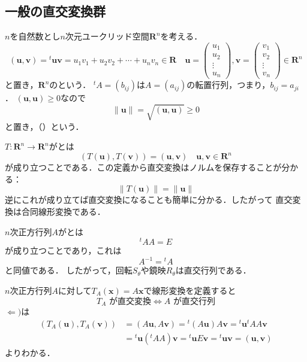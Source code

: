 %
%
%
%

\subsection{一般の直交変換群}
$n$を自然数とし$n$次元ユークリッド空間$\mathbf R^n$を考える．
\[
     (\mathbf u,\mathbf v)={}^t\mathbf u\mathbf v
     =u_1v_1+u_2v_2+\cdots+u_nv_n\in \mathbf R
     \quad
     \mathbf u
      =\begin{pmatrix}
              u_1\\u_2\\\vdots\\u_n
     \end{pmatrix},
     \mathbf v
      =\begin{pmatrix}
              v_1\\v_2\\\vdots\\v_n
     \end{pmatrix}
     \in \mathbf R^n
\]
と置き，$\mathbf R^n$のという．
${}^tA=(b_{ij})$は$A=(a_{ij})$の転置行列，つまり，$b_{ij}=a_{ji}$．
$(\mathbf u,\mathbf u)\ge 0$なので
\[
     \|\mathbf u\| 
     = 
     \sqrt{(\mathbf u,\mathbf u)}
     \ge 0
\]
と置き，（）という．

$T:\mathbf R^n\to \mathbf R^n$がとは
\begin{equation}\label{orthogonalTransform}
     (T(\mathbf u),T(\mathbf v))
     =
     (\mathbf u,\mathbf v)\quad
     \mathbf u,\mathbf v\in \mathbf R^n
\end{equation}
が成り立つことである．この定義から直交変換はノルムを保存することが分かる：
\begin{equation}\label{preserveNorm}
     \|T(\mathbf u)\| = \|\mathbf u\| 
\end{equation}
逆にこれが成り立てば直交変換になることも簡単に分かる．したがって
直交変換は合同線形変換である．

$n$次正方行列$A$がとは
\[
     {}^tAA=E
\]
が成り立つことであり，これは
\[
     A^{-1}={}^tA
\]と同値である．
したがって，回転$S_\theta$や鏡映$R_{\theta}$は直交行列である．

$n$次正方行列$A$に対して$T_A(\mathbf x)=A\mathbf x$で線形変換を定義すると
\[
     T_A\text{ が直交変換}
     \Leftrightarrow 
     A\text{ が直交行列}
\]
$\Leftarrow)$は
\[
\begin{split}
     (T_A(\mathbf u),T_A(\mathbf v))
     &=
     (A\mathbf u,A\mathbf v)
     =
     {}^t(A\mathbf u)A\mathbf v
     =
     {}^t\mathbf u{}^tAA\mathbf v\\
     &
     =
     {}^t\mathbf u({}^tAA)\mathbf v
     =
     {}^t\mathbf uE\mathbf v
     =
     {}^t\mathbf u\mathbf v
     =
     (\mathbf u,\mathbf v)
\end{split}
\]
よりわかる．

